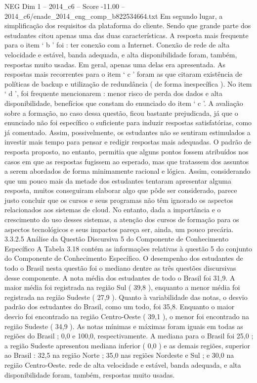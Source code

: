 \begin{textsample}{NEG Dim 1 – 2014\_c6 – Score -11.00 – 2014\_c6/enade\_2014\_eng\_comp\_b822534664.txt}
Em segundo lugar, a simplificação dos requisitos da plataforma do cliente.
Sendo que grande parte dos estudantes citou apenas uma das duas características.
A resposta mais frequente para o item ‘ b ’ foi : ter conexão com a Internet.
Conexão de rede de alta velocidade e estável, banda adequada, e alta disponibilidade foram, também, respostas muito usadas.
Em geral, apenas uma delas era apresentada.
As respostas mais recorrentes para o item ‘ c ’ foram as que citaram existência de políticas de backup e utilização de redundância ( de forma inespecífica ).
No item ‘ d ’, foi frequente mencionarem : menor risco de perda dos dados e alta disponibilidade, benefícios que constam do enunciado do item ‘ c ’.
A avaliação sobre a formação, no caso dessa questão, ficou bastante prejudicada, já que o enunciado não foi específico o suficiente para induzir respostas satisfatórias, como já comentado.
Assim, possivelmente, os estudantes não se sentiram estimulados a investir mais tempo para pensar e redigir respostas mais adequadas.
O padrão de resposta proposto, no entanto, permitia que alguns pontos fossem atribuídos nos casos em que as respostas fugissem ao esperado, mas que tratassem dos assuntos a serem abordados de forma minimamente racional e lógica.
Assim, considerando que um pouco mais da metade dos estudantes tentaram apresentar alguma resposta, muitos conseguiram elaborar algo que pôde ser considerado, parece justo concluir que os cursos e seus programas não têm ignorado os aspectos relacionados aos sistemas de cloud.
No entanto, dada a importância e o crescimento do uso desses sistemas, a atenção dos cursos de formação para os aspectos tecnológicos e seus impactos pareça ser, ainda, um pouco precária. 3.3.2.5 Análise da Questão Discursiva 5 do Componente de Conhecimento Específico A Tabela 3.18 contém as informações relativas à questão 5 do conjunto do Componente de Conhecimento Específico.
O desempenho dos estudantes de todo o Brasil nesta questão foi o mediano dentre as três questões discursivas desse componente.
A nota média dos estudantes de todo o Brasil foi 31,9.
A maior média foi registrada na região Sul ( 39,8 ), enquanto a menor média foi registrada na região Sudeste ( 27,9 ).
Quanto à variabilidade das notas, o desvio padrão dos estudantes do Brasil, como um todo, foi 35,8.
Enquanto o maior desvio foi encontrado na região Centro-Oeste ( 39,1 ), o menor foi encontrado na região Sudeste ( 34,9 ).
As notas mínimas e máximas foram iguais em todas as regiões do Brasil ; 0,0 e 100,0, respectivamente.
A mediana para o Brasil foi 25,0 ; a região Sudeste apresentou mediana inferior ( 0,0 ) e as demais regiões, superior ao Brasil : 32,5 na região Norte ; 35,0 nas regiões Nordeste e Sul ; e 30,0 na região Centro-Oeste. rede de alta velocidade e estável, banda adequada, e alta disponibilidade foram, também, respostas muito usadas.

\end{textsample}
